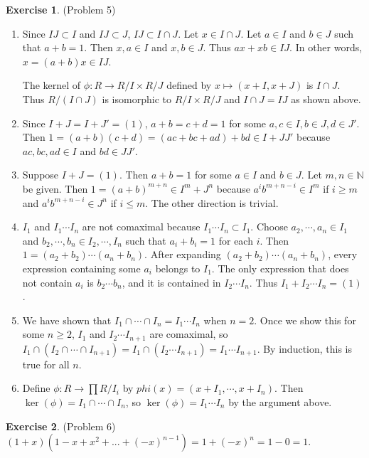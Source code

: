 \documentclass[12pt, psamsfonts]{amsart}
\theoremstyle{definition}
\newtheorem*{exer}{Exercise}
\theoremstyle{remark}
\numberwithin{equation}{section}
\begin{document}
\begin{exer}{(Problem 5)}
  \begin{enumerate}
    \item 
      Since $IJ \subset I$ and $IJ \subset J$, $IJ \subset I \cap J$.
      Let $x \in I \cap J$.
      Let $a \in I$ and $b \in J$ such that $a + b = 1$.
      Then $x, a \in I$ and $x, b \in J$.
      Thus $ax + xb \in IJ$.
      In other words, $x = (a + b)x \in IJ$.

      The kernel of $\phi: R \rightarrow R / I \times R / J$ defined by $x \mapsto (x + I, x + J)$ is $I \cap J$.
      Thus $R / (I \cap J)$ is isomorphic to $R / I \times R / J$ and $I \cap J = IJ$ as shown above.
    \item
      Since $I + J = I + J' = (1)$, $a + b = c + d = 1$ for some $a, c \in I, b \in J, d \in J'$.
      Then $1 = (a + b)(c + d) = (ac + bc + ad) + bd \in I + JJ'$ because $ac, bc, ad \in I$ and $bd \in JJ'$.
    \item
      Suppose $I + J = (1)$.
      Then $a + b = 1$ for some $a \in I$ and $b \in J$.
      Let $m, n \in \mathbb{N}$ be given.
      Then $1 = (a + b)^{m + n} \in I^m + J^n$ because $a^ib^{m + n - i} \in I^m$ if $i \geq m$ and $a^ib^{m + n - i} \in J^n$ if $i \leq m$.
      The other direction is trivial.
    \item
      $I_1$ and $I_1 \cdots I_n$ are not comaximal because $I_1 \cdots I_n \subset I_1$.
      Choose $a_2, \cdots, a_n \in I_1$ and $b_2, \cdots, b_n \in I_2, \cdots, I_n$ such that $a_i + b_i = 1$ for each $i$.
      Then $1 = (a_2 + b_2) \cdots (a_n + b_n)$.
      After expanding $(a_2 + b_2) \cdots (a_n + b_n)$, every expression containing some $a_i$ belongs to $I_1$.
      The only expression that does not contain $a_i$ is $b_2 \cdots b_n$, and it is contained in $I_2 \cdots I_n$.
      Thus $I_1 + I_2 \cdots I_n = (1)$.
    \item
      We have shown that $I_1 \cap \cdots \cap I_n = I_1 \cdots I_n$ when $n = 2$.
      Once we show this for some $n \geq 2$, $I_1$ and $I_2 \cdots I_{n + 1}$ are comaximal, so $I_1 \cap (I_2 \cap \cdots \cap I_{n + 1}) = I_1 \cap (I_2 \cdots I_{n + 1}) = I_1 \cdots I_{n + 1}$.
      By induction, this is true for all $n$.
    \item
      Define $\phi: R \rightarrow \prod R / I_i$ by $phi(x) = (x + I_1, \cdots, x + I_n)$.
      Then $\ker(\phi) = I_1 \cap \cdots \cap I_n$, so $\ker(\phi) = I_1 \cdots I_n$ by the argument above.
  \end{enumerate}
\end{exer}

\begin{exer}{(Problem 6)}
  $(1 + x)(1 - x + x^2 + ... + (-x)^{n - 1}) = 1 + (-x)^n = 1 - 0 = 1$.
\end{exer}
\end{document}
